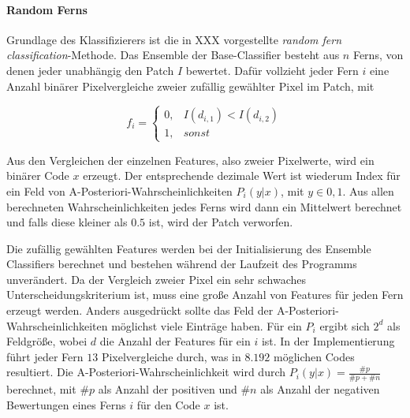 	\paragraph{Random Ferns}
	Grundlage des Klassifizierers ist die in XXX vorgestellte \textit{random fern classification}-Methode. Das Ensemble der Base-Classifier besteht aus $n$ Ferns, von denen jeder unabhängig den Patch $I$ bewertet. Dafür vollzieht jeder Fern $i$ eine Anzahl binärer Pixelvergleiche zweier zufällig gewählter Pixel im Patch, mit

	\begin{equation}
	f_{i}=\begin{cases}
	0, & I(d_{i,1})<I(d_{i,2})\\
	1, & sonst
	\end{cases}
	\end{equation}

	Aus den Vergleichen der einzelnen Features, also zweier Pixelwerte, wird ein binärer Code $x$ erzeugt. Der entsprechende dezimale Wert ist wiederum Index für ein Feld von A-Posteriori-Wahrscheinlichkeiten $P_{i}(y|x)$, mit $y\in{0,1}$. Aus allen berechneten Wahrscheinlichkeiten jedes Ferns wird dann ein Mittelwert berechnet und falls diese kleiner als $0.5$ ist, wird der Patch verworfen.

	Die zufällig gewählten Features werden bei der Initialisierung des Ensemble Classifiers berechnet und bestehen während der Laufzeit des Programms unverändert. Da der Vergleich zweier Pixel ein sehr schwaches Unterscheidungskriterium ist, muss eine große Anzahl von Features für jeden Fern erzeugt werden. Anders ausgedrückt sollte das Feld der A-Posteriori-Wahrscheinlichkeiten möglichst viele Einträge haben. Für ein $P_{i}$ ergibt sich $2^{d}$ als Feldgröße, wobei $d$ die Anzahl der Features für ein $i$ ist. In der Implementierung führt jeder Fern $13$ Pixelvergleiche durch, was in $8.192$ möglichen Codes resultiert. Die A-Posteriori-Wahrscheinlichkeit wird durch $P_{i}(y|x)=\frac{\#p}{\#p+\#n}$ berechnet, mit $\#p$ als Anzahl der positiven und $\#n$ als Anzahl der negativen Bewertungen eines Ferns $i$ für den Code $x$ ist.

